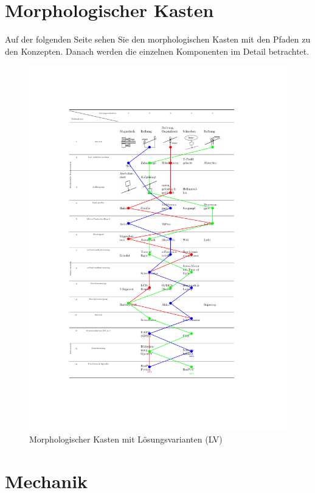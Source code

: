 \documentclass[a4paper]{report}
\begin{document}
\section{Morphologischer Kasten}
\label{app:sec:MorphKasten}
Auf der folgenden Seite sehen Sie den morphologischen Kasten mit den Pfaden zu den Konzepten. Danach werden die einzelnen Komponenten im Detail betrachtet.

\begin{figure}[h!]
	\includegraphics[keepaspectratio,height=0.9\textheight]{Morphkasten.pdf}
	\caption{Morphologischer Kasten mit Lösungsvarianten (LV)}
	\label{fig:MorphKasten}
\end{figure}

\newpage
\section{Mechanik}
\label{app:sec:Mech}
\end{document}
